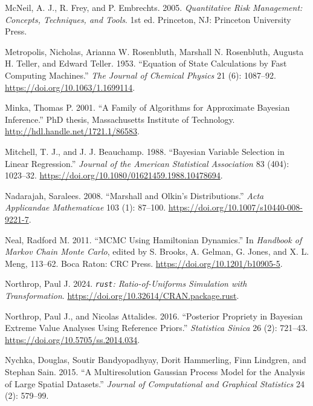 \documentclass[
  11pt,
  letterpaper,
]{scrbook}
\newlength{\cslhangindent}
\newenvironment{CSLReferences}[2] %
 {\begin{list}{}{%
  \setlength{\itemindent}{0pt}
  \setlength{\leftmargin}{0pt}
  \setlength{\parsep}{0pt}
  \ifodd #1
   \setlength{\leftmargin}{\cslhangindent}
   \setlength{\itemindent}{-1\cslhangindent}
  \fi
  \setlength{\itemsep}{#2\baselineskip}}}
 {\end{list}}
\theoremstyle{plain}
\theoremstyle{definition}
\theoremstyle{definition}
\theoremstyle{plain}
\theoremstyle{plain}
\theoremstyle{definition}
\theoremstyle{remark}
\begin{document}
\begin{CSLReferences}{1}{0}
McNeil, A. J., R. Frey, and P. Embrechts. 2005. \emph{Quantitative Risk
Management: Concepts, Techniques, and Tools}. 1st ed. Princeton, NJ:
Princeton University Press.

Metropolis, Nicholas, Arianna W. Rosenbluth, Marshall N. Rosenbluth,
Augusta H. Teller, and Edward Teller. 1953. {``Equation of State
Calculations by Fast Computing Machines.''} \emph{The Journal of
Chemical Physics} 21 (6): 1087--92.
\url{https://doi.org/10.1063/1.1699114}.

Minka, Thomas P. 2001. {``A Family of Algorithms for Approximate
{B}ayesian Inference.''} PhD thesis, Massachusetts Institute of
Technology. \url{http://hdl.handle.net/1721.1/86583}.

Mitchell, T. J., and J. J. Beauchamp. 1988. {``Bayesian Variable
Selection in Linear Regression.''} \emph{Journal of the American
Statistical Association} 83 (404): 1023--32.
\url{https://doi.org/10.1080/01621459.1988.10478694}.

Nadarajah, Saralees. 2008. {``{M}arshall and {O}lkin's Distributions.''}
\emph{Acta Applicandae Mathematicae} 103 (1): 87--100.
\url{https://doi.org/10.1007/s10440-008-9221-7}.

Neal, Radford M. 2011. {``{MCMC} Using {H}amiltonian Dynamics.''} In
\emph{Handbook of {M}arkov Chain {M}onte {C}arlo}, edited by S. Brooks,
A. Gelman, G. Jones, and X. L. Meng, 113--62. Boca Raton: CRC Press.
\url{https://doi.org/10.1201/b10905-5}.

Northrop, Paul J. 2024. \emph{\texttt{rust}: Ratio-of-Uniforms
Simulation with Transformation}.
\url{https://doi.org/10.32614/CRAN.package.rust}.

Northrop, Paul J., and Nicolas Attalides. 2016. {``Posterior Propriety
in {B}ayesian Extreme Value Analyses Using Reference Priors.''}
\emph{Statistica Sinica} 26 (2): 721--43.
\url{https://doi.org/10.5705/ss.2014.034}.

Nychka, Douglas, Soutir Bandyopadhyay, Dorit Hammerling, Finn Lindgren,
and Stephan Sain. 2015. {``A Multiresolution {G}aussian Process Model
for the Analysis of Large Spatial Datasets.''} \emph{Journal of
Computational and Graphical Statistics} 24 (2): 579--99.


\end{CSLReferences}
\end{document}
